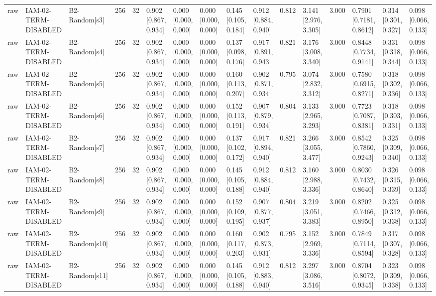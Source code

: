 \begin{table}[!ht]
{\begin{tabular}{llllllllllllllll}
raw & IAM-02-TERM-DISABLED & B2-Random[s3] & 256 & 32 & 0.902 [0.867, 0.934] & 0.000 [0.000, 0.000] & 0.000 [0.000, 0.000] & 0.145 [0.105, 0.184] & 0.912 [0.884, 0.940] & 0.812 & 3.141 [2.976, 3.305] & 3.000 & 0.7901 [0.7181, 0.8612] & 0.314 [0.301, 0.327] & 0.098 [0.066, 0.133] \\
raw & IAM-02-TERM-DISABLED & B2-Random[s4] & 256 & 32 & 0.902 [0.867, 0.934] & 0.000 [0.000, 0.000] & 0.000 [0.000, 0.000] & 0.137 [0.098, 0.176] & 0.917 [0.891, 0.943] & 0.821 & 3.176 [3.008, 3.340] & 3.000 & 0.8448 [0.7734, 0.9141] & 0.331 [0.318, 0.344] & 0.098 [0.066, 0.133] \\
raw & IAM-02-TERM-DISABLED & B2-Random[s5] & 256 & 32 & 0.902 [0.867, 0.934] & 0.000 [0.000, 0.000] & 0.000 [0.000, 0.000] & 0.160 [0.113, 0.207] & 0.902 [0.871, 0.934] & 0.795 & 3.074 [2.832, 3.312] & 3.000 & 0.7580 [0.6915, 0.8271] & 0.318 [0.302, 0.336] & 0.098 [0.066, 0.133] \\
raw & IAM-02-TERM-DISABLED & B2-Random[s6] & 256 & 32 & 0.902 [0.867, 0.934] & 0.000 [0.000, 0.000] & 0.000 [0.000, 0.000] & 0.152 [0.113, 0.191] & 0.907 [0.879, 0.934] & 0.804 & 3.133 [2.965, 3.293] & 3.000 & 0.7723 [0.7087, 0.8381] & 0.318 [0.303, 0.331] & 0.098 [0.066, 0.133] \\
raw & IAM-02-TERM-DISABLED & B2-Random[s7] & 256 & 32 & 0.902 [0.867, 0.934] & 0.000 [0.000, 0.000] & 0.000 [0.000, 0.000] & 0.137 [0.102, 0.172] & 0.917 [0.894, 0.940] & 0.821 & 3.266 [3.055, 3.477] & 3.000 & 0.8542 [0.7860, 0.9243] & 0.325 [0.309, 0.340] & 0.098 [0.066, 0.133] \\
raw & IAM-02-TERM-DISABLED & B2-Random[s8] & 256 & 32 & 0.902 [0.867, 0.934] & 0.000 [0.000, 0.000] & 0.000 [0.000, 0.000] & 0.145 [0.105, 0.188] & 0.912 [0.884, 0.940] & 0.812 & 3.160 [2.988, 3.336] & 3.000 & 0.8030 [0.7432, 0.8640] & 0.326 [0.315, 0.339] & 0.098 [0.066, 0.133] \\
raw & IAM-02-TERM-DISABLED & B2-Random[s9] & 256 & 32 & 0.902 [0.867, 0.934] & 0.000 [0.000, 0.000] & 0.000 [0.000, 0.000] & 0.152 [0.109, 0.195] & 0.907 [0.877, 0.937] & 0.804 & 3.219 [3.051, 3.383] & 3.000 & 0.8202 [0.7466, 0.8950] & 0.325 [0.312, 0.338] & 0.098 [0.066, 0.133] \\
raw & IAM-02-TERM-DISABLED & B2-Random[s10] & 256 & 32 & 0.902 [0.867, 0.934] & 0.000 [0.000, 0.000] & 0.000 [0.000, 0.000] & 0.160 [0.117, 0.203] & 0.902 [0.873, 0.931] & 0.795 & 3.152 [2.969, 3.336] & 3.000 & 0.7849 [0.7114, 0.8594] & 0.317 [0.307, 0.328] & 0.098 [0.066, 0.133] \\
raw & IAM-02-TERM-DISABLED & B2-Random[s11] & 256 & 32 & 0.902 [0.867, 0.934] & 0.000 [0.000, 0.000] & 0.000 [0.000, 0.000] & 0.145 [0.105, 0.188] & 0.912 [0.883, 0.940] & 0.812 & 3.297 [3.086, 3.516] & 3.000 & 0.8704 [0.8072, 0.9345] & 0.323 [0.309, 0.338] & 0.098 [0.066, 0.133] \\

\end{tabular}}
\end{table}
